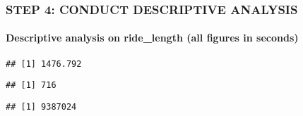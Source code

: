 \documentclass[
]{article}
\newenvironment{Shaded}{\begin{snugshade}}{\end{snugshade}}
\newcommand{\CommentTok}[1]{\textcolor[rgb]{0.56,0.35,0.01}{\textit{#1}}}
\newcommand{\FunctionTok}[1]{\textcolor[rgb]{0.00,0.00,0.00}{#1}}
\newcommand{\NormalTok}[1]{#1}
\newcommand{\SpecialCharTok}[1]{\textcolor[rgb]{0.00,0.00,0.00}{#1}}
\begin{document}
\hypertarget{step-4-conduct-descriptive-analysis}{%
\subsubsection{STEP 4: CONDUCT DESCRIPTIVE
ANALYSIS}\label{step-4-conduct-descriptive-analysis}}

\hypertarget{descriptive-analysis-on-ride_length-all-figures-in-seconds}{%
\paragraph{Descriptive analysis on ride\_length (all figures in
seconds)}\label{descriptive-analysis-on-ride_length-all-figures-in-seconds}}

\begin{Shaded}
\end{Shaded}

\begin{verbatim}
## [1] 1476.792
\end{verbatim}

\begin{Shaded}
\end{Shaded}

\begin{verbatim}
## [1] 716
\end{verbatim}

\begin{Shaded}
\end{Shaded}

\begin{verbatim}
## [1] 9387024
\end{verbatim}

\begin{Shaded}
\end{Shaded}
\end{document}
